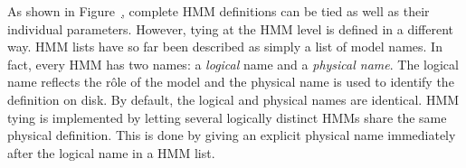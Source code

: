 As shown in Figure~\href{f:hierarch}, complete HMM
definitions can be tied as well as their individual parameters.  However,
tying at the HMM level is defined in a different way.  
HMM lists have so far
been described as simply a list of model names. In fact, every HMM has two
names: a {\it logical} name and a {\it physical name}. The logical name
reflects the r\^{o}le of the model and the physical name is used to
identify the definition on disk.  By default, the logical and physical names
are identical.  HMM tying is implemented by letting several logically
distinct HMMs share the same physical definition.  This is done by giving
an explicit physical name immediately after the logical name in a HMM 
list.



